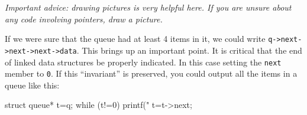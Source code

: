 \begin{center}
\end{center}

\emph{Important advice:  drawing pictures is very helpful here. If you are unsure about any code involving pointers, draw a picture.}

If we were sure that the queue had at least 4 items in it, we could write \lstinline!q->next->next->next->data!.
This brings up an important point.
It is critical that the end of linked data structures be properly indicated.
In this case setting the \texttt{next} member to \texttt{0}.
If this ``invariant'' is preserved, you could output all the items in a queue like this:
\begin{codeinline}
struct queue* t=q;
while (t!=0) {
    printf("%
    t=t->next;
}
\end{codeinline}

